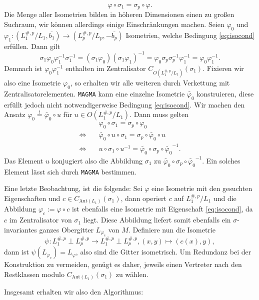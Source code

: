 \documentclass[12pt,a4paper,halfparskip,headsepline,bibtotocnumbered]{scrreprt}
\theoremstyle{nummermitklammern}
\theoremstyle{nonumberbreak}
\begin{document}
\begin{equation}\label{eq:isocond}
\varphi \circ \sigma_1 = \sigma_p \circ \varphi.
\end{equation}
Die Menge aller Isometrien bilden in höheren Dimensionen einen zu großen Suchraum, wir können allerdings einige Einschränkungen machen. Seien $\varphi_0$ und $\varphi_1 : (L_1^{\#,p} / L_1, \overline{b_1}) \rightarrow (L_p^{\#,p} / L_p, -\overline{b_p})$ Isometrien, welche Bedingung \eqref{eq:isocond} erfüllen. Dann gilt
\begin{equation*}
	\sigma_1 \varphi_0 \varphi_1^{-1} \sigma_1^{-1} = (\sigma_1 \varphi_0) (\sigma_1 \varphi_1)^{-1} = \varphi_0 \sigma_p \sigma_p^{-1} \varphi_1^{-1} = \varphi_0 \varphi_1^{-1}.
\end{equation*}
Demnach ist $\varphi_0 \varphi_1^{-1}$ enthalten im Zentralisator $C_{O(L_1^{\#,p} / L_1)}(\sigma_1)$. Fixieren wir also eine Isometrie $\varphi_0$, so erhalten wir alle weiteren durch Verkettung mit Zentralisatorelementen. \texttt{MAGMA} kann eine einzelne Isometrie $\tilde{\varphi_0}$ konstruieren, diese erfüllt jedoch nicht notwendigerweise Bedingung \eqref{eq:isocond}. Wir machen den Ansatz $\varphi_0 \stackrel{!}{=} \tilde{\varphi_0} \circ u$ für $u \in O(L_1^{\#,p}/L_1)$. Dann muss gelten
\begin{align*}
	&\quad\varphi_0 \circ \sigma_1 = \sigma_p \circ \varphi_0\\
	\Leftrightarrow& \quad\tilde{\varphi_0} \circ u \circ \sigma_1 = \sigma_p \circ \tilde{\varphi_0} \circ u \\
	\Leftrightarrow& \quad u \circ \sigma_1 \circ u^{-1} = \tilde{\varphi_0} \circ \sigma_p \circ \tilde{\varphi_0}^{-1}.
\end{align*}
Das Element $u$ konjugiert also die Abbildung $\sigma_1$ zu $\tilde{\varphi_0} \circ \sigma_p \circ \tilde{\varphi_0}^{-1}$. Ein solches Element lässt sich durch \texttt{MAGMA} bestimmen.\par
Eine letzte Beobachtung, ist die folgende: Sei $\varphi$ eine Isometrie mit den gesuchten Eigenschaften und $c \in C_{\text{Aut}(L_1)}(\sigma_1)$, dann operiert $c$ auf $L_1^{\#,p} / L_1$ und die Abbildung $\varphi_c := \varphi \circ c$ ist ebenfalls eine Isometrie mit Eigenschaft \eqref{eq:isocond}, da $c$ im Zentralisator von $\sigma_1$ liegt. Diese Abbildung liefert somit ebenfalls ein $\sigma$-invariantes ganzes Obergitter $L_{\varphi_c}$ von $M$. Definiere nun die Isometrie
\begin{equation*}
	\psi : L_1^{\#,p} \perp L_p^{\#,p} \rightarrow L_1^{\#,p} \perp L_p^{\#,p}, (x, y) \mapsto ( c(x), y),
\end{equation*}
dann ist $\psi(L_{\varphi_c}) = L_\varphi$, also sind die Gitter isometrisch. Um Redundanz bei der Konstruktion zu vermeiden, genügt es daher, jeweils einen Vertreter nach den Restklassen modulo $C_{\text{Aut}(L_1)}(\sigma_1)$ zu wählen.\par
Insgesamt erhalten wir also den Algorithmus:
\end{document}
